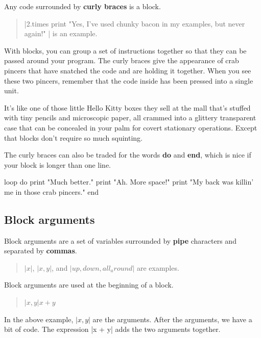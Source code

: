 \documentclass[12pt,twoside]{report}
\begin{document}
Any code surrounded by {\bf curly braces} is a block.

\begin{quote}
\rubyinline|2.times { print "Yes, I've used chunky bacon in my examples, but never again!" }| is an example.\end{quote}


With blocks, you can group a set of instructions together so that they
can be passed around your program.  The curly braces give the
appearance of crab pincers that have snatched the code and are holding
it together.  When you see these two pincers, remember that the code
inside has been pressed into a single unit.

It's like one of those little Hello Kitty boxes they sell at the mall
that's stuffed with tiny pencils and microscopic paper, all crammed
into a glittery transparent case that can be concealed in your palm
for covert stationary operations.  Except that blocks don't require so
much squinting.

The curly braces can also be traded for the words {\bf do} and {\bf
  end}, which is nice if your block is longer than one line.

\begin{rubycode}

 loop do
   print "Much better."
   print "Ah.  More space!"
   print "My back was killin' me in those crab pincers."
 end

\end{rubycode}





\subsection{Block arguments}



Block arguments are a set of variables surrounded by {\bf pipe}
characters and separated by {\bf commas}.

\begin{quote}
\rubyinline$|x|$,
\rubyinline$|x,y|$, and
\rubyinline$|up, down, all_around|$ are
examples.\end{quote}


Block arguments are used at the beginning of a block.

\begin{quote}
\rubyinline${ |x,y| x + y }$\end{quote}


In the above example, \rubyinline$|x,y|$ are the
arguments.  After the arguments, we have a bit of code.  The
expression \rubyinline|x + y| adds the two arguments
together.
\end{document}
